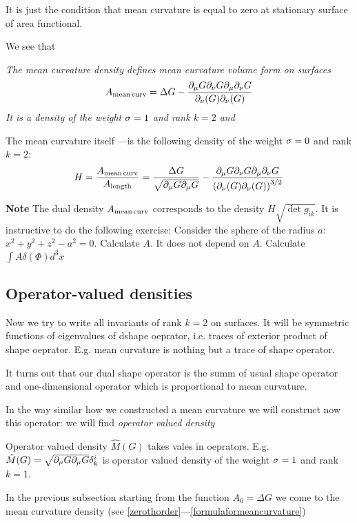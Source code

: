 \documentclass[12pt]{article}
\theoremstyle{theorem}
\begin{document}
It is just the condition that mean curvature is equal to zero at stationary surface
of area functional.

We see  that


 {\it The mean curvature density defines mean curvature volume form on surfaces
               \begin{equation}\label{meancurvaturevolumeform}
    A_{\rm mean\,curv}=\Delta G-{\partial_\mu G\partial_\nu G \partial_\mu\partial_\nu G\over \partial_\nu (G)\partial_\nu (G)}
                  \end{equation}
It is a density of the weight ${\sigma}=1$ and rank $k=2$ and

  The mean curvature itself  ---is the following
  density of the weight ${\sigma}=0$ and rank $k=2$:
             \begin{equation}\label{meancurvatureitself}
   H= {A_{\rm mean\,curv}\over A_{\rm length}}=
   {\Delta G\over \sqrt{\partial_\mu G\partial_\mu G}}-
   {\partial_\mu G\partial_\nu G \partial_\mu\partial_\nu G\over \left(\partial_\nu (G)\partial_\nu (G)\right)^{3/2}}
                  \end{equation}
}

{\bf Note} The dual density $A_{\rm mean\,curv}$ corresponds to the density
$H\sqrt {\det g_{ik}}$. It is instructive to do the following exercise:
Consider the sphere of the radius $a$: $x^2+y^2+z^2-a^2=0$. Calculate $A$.
It does not depend on $A$. Calculate $\int A\delta(\Phi)d^3 x$

\subsection {Operator-valued densities}

Now we try to write all invariants of rank $k=2$ on surfaces. It will be
symmetric functions of eigenvalues of dshape oeprator, i.e. traces of exterior product
of shape oeprator. E.g. mean curvature is nothing but a trace of shape operator.

It turns out that our dual shape operator is the summ of usual shape operator
and one-dimensional operator which is proportional to mean curvature.

In the way similar  how we constructed a mean curvature we will construct now
this operator: we will find {\it operator valued density}

Operator valued density $\hat M(G)$ takes vales in oeprators.
E.g. $\hat M(G)=\sqrt{\partial_\mu G\partial_\mu G}\delta^i_k$ is operator valued density
of the weight ${\sigma}=1$ and rank $k=1$.

In the previous subsection starting from the function $A_0=\Delta G$
we come to the mean curvature density (see \eqref{zerothorder}---\eqref{formulaformeancurvature})
\end{document}
